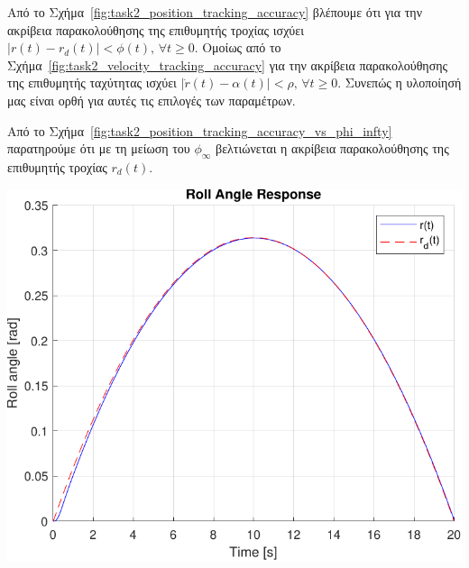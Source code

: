 \documentclass[a4paper,12pt]{article}
\begin{document}
Από το Σχήμα~\ref{fig:task2_position_tracking_accuracy} βλέπουμε ότι για την ακρίβεια παρακολούθησης
της επιθυμητής τροχίας ισχύει $|r(t) - r_d(t)| < \phi(t), \, \forall t \geq 0$. Ομοίως από το 
Σχήμα~\ref{fig:task2_velocity_tracking_accuracy} για την ακρίβεια παρακολούθησης της επιθυμητής ταχύτητας 
ισχύει $|\dot{r}(t) - \alpha(t)| < \rho, \, \forall t \geq 0$. Συνεπώς η υλοποίησή μας είναι ορθή για αυτές
τις επιλογές των παραμέτρων.

Από το Σχήμα~\ref{fig:task2_position_tracking_accuracy_vs_phi_infty} παρατηρούμε ότι με τη μείωση του 
$\phi_{\infty}$ βελτιώνεται η ακρίβεια παρακολούθησης της επιθυμητής τροχίας $r_d(t)$.

\begin{minipage}[t]{0.45\textwidth}
    \centering
    \includegraphics[width=\linewidth]{plot/task2_roll_angle_response.pdf}
    \label{fig:task2_roll_angle_response}
\end{minipage}%
\hfill
\end{document}
